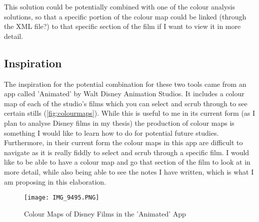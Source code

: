 \documentclass{article}
\begin{document}
This solution could be potentially combined with one of the colour analysis solutions, so that a specific portion of the colour map could be linked (through the XML file?) to that specific section of the film if I want to view it in more detail.

\subsection*{Inspiration}

The inspiration for the potential combination for these two tools came from an app called 'Animated' by Walt Disney Animation Studios. It includes a colour map of each of the studio's films which you can select and scrub through to see certain stills (\autoref{fig:colourmaps}). While this is useful to me in its current form (as I plan to analyse Disney films in my thesis) the production of colour maps is something I would like to learn how to do for potential future studies. Furthermore, in their current form the colour maps in this app are difficult to navigate as it is really fiddly to select and scrub through a specific film. I would like to be able to have a colour map and go that section of the film to look at in more detail, while also being able to see the notes I have written, which is what I am proposing in this elaboration.

\begin{figure}[htp]
    \centering
    \texttt{[image: IMG\_9495.PNG]}
    \caption{Colour Maps of Disney Films in the 'Animated' App}
    \label{fig:colourmaps}
\end{figure}
\end{document}
